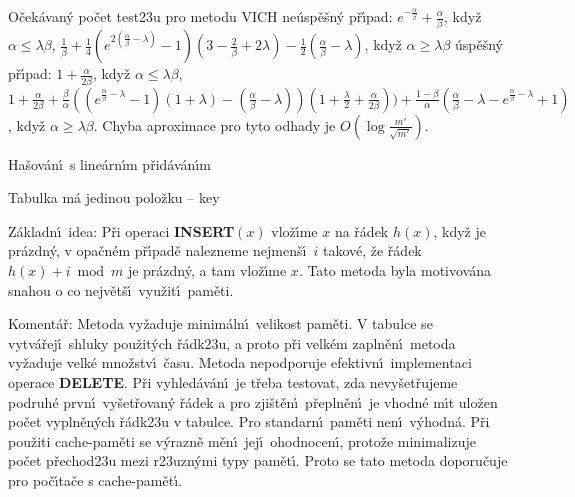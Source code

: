 \flushpar O\v cek\'avan\'y po\v cet test\accent23u pro metodu VICH\newline 
ne\'usp\v e\v sn\'y p\v r\'\i pad:\newline 
\phantom{---}$e^{-\frac {\alpha}{\beta}}+\frac {
\alpha}{\beta}$, kdy\v z  $\alpha\le\lambda\beta$, \newline 
\phantom{---}$\frac 1{\beta}+\frac 14\left(e^{2\left(\frac {\alpha}{\beta}-\lambda \right)}-1\right)
\left(3-\frac 2{\beta}+2\lambda \right)-\frac 12\left(\frac {\alpha}{\beta}-\lambda 
\right)$, kdy\v z $\alpha\ge\lambda\beta$\newline 
\'usp\v e\v sn\'y p\v r\'\i pad:\newline 
\phantom{---}$1+\frac {\alpha}{2\beta}$, kdy\v z $
\alpha\le\lambda\beta$, \newline 
\phantom{---}$1+\frac {\alpha}{2\beta}+\frac {\beta}{\alpha}\left(\left(e^{\frac {\alpha}{
\beta}-\lambda}-1\right)\left(1+\lambda \right)-\left(\frac {\alpha}{\beta}-\lambda \right)\right)\left(
1+\frac {\lambda}2+\frac {\alpha}{2\beta}\right))+\frac {1-\beta}{\alpha}
\left(\frac {\alpha}{\beta}-\lambda -e^{\frac {\alpha}{\beta}-\lambda}
+1\right)$, 
kdy\v z $\alpha\ge\lambda\beta$.
\medskip
\flushpar Chyba aproximace pro tyto odhady je $O\left(\log\frac {m'}{\sqrt {
m'}}\right)$.


\heading
Ha\v sov\'an\'\i\ s line\'arn\'\i m p\v rid\'av\'an\'\i m
\endheading

\flushpar Tabulka m\'a jedinou polo\v zku -- key
\medskip

\flushpar Z\'akladn\'\i\ idea:  P\v ri operaci {\bf INSERT$\left(x\right)$} vlo\v z\'\i me $
x$ 
na \v r\'adek $h\left(x\right)$, kdy\v z je pr\'azdn\'y, v opa\v cn\'em p\v r\'\i pad\v e 
nalezneme nejmen\v s\'\i\ $i$ takov\'e, \v ze \v r\'adek $h\left(x\right)+i\bmod 
m$ je 
pr\'azdn\'y, a tam vlo\v z\'\i me $x$. Tato metoda byla motivov\'ana snahou o co nejv\v et\v s\'\i\ vyu\v zit\'\i\ pam\v eti. 
\medskip

\flushpar Koment\'a\v r:  Metoda vy\v zaduje minim\'aln\'\i\ velikost pam\v eti.  
V tabulce se vytv\'a\v rej\'\i\ shluky pou\v zit\'ych \v r\'adk\accent23u, a proto 
p\v ri velk\'em zapln\v en\'\i\ metoda vy\v zaduje velk\'e mno\v zstv\'\i\ \v casu.  
Metoda nepodporuje efektivn\'\i\ implementaci operace {\bf DELETE}.  
P\v ri vy\-hle\-d\'a\-v\'a\-n\'\i\ je t\v reba testovat, zda nevy\v set\v rujeme 
podruh\'e prvn\'\i\ vy\v set\v rovan\'y \v r\'adek a pro zji\v st\v en\'\i\ p\v repln\v en\'\i\ je 
vhodn\'e m\'\i t ulo\v zen po\v cet vypln\v en\'ych \v r\'adk\accent23u v tabulce. Pro standarn\'\i\ pam\v eti nen\'\i\ v\'yhodn\'a. P\v ri pou\v ziti cache-pam\v eti se v\'yrazn\v e m\v en\'\i\ jej\'\i\ ohodnocen\'\i, proto\v ze minimalizuje po\v cet p\v rechod\accent23u mezi r\accent23uzn\'ymi typy pam\v et\'\i. Proto se tato metoda doporu\v cuje pro po\v c\'\i ta\v ce s cache-pam\v et\'\i.
\medskip

